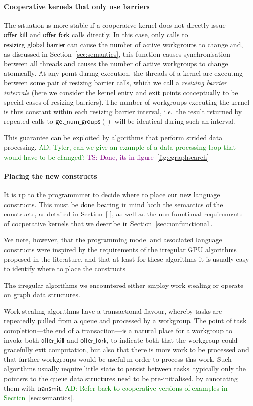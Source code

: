 \documentclass[nocopyrightspace,10pt]{sigplanconf}
\newcommand{\ADComment}[1]{\textcolor{green}{AD: #1}}
\newcommand{\TSComment}[1]{\textcolor{purple}{TS: #1}}
\newcommand{\transmit}{\mathsf{transmit}}
\newcommand{\offerfork}{\mathsf{offer\_fork}}
\newcommand{\offerkill}{\mathsf{offer\_kill}}
\newcommand{\resizingglobalbarrier}{\mathsf{resizing\_global\_barrier}}
\newcommand{\getnumgroups}{\mathsf{get\_num\_groups}}
\begin{document}
\paragraph{Cooperative kernels that only use barriers}

The situation is more stable if a cooperative kernel does not directly
issue $\offerkill$ and $\offerfork$ calls directly.  In this case,
only calls to $\resizingglobalbarrier$ can cause the number of active
workgroups to change and, as discussed in Section~\ref{sec:semantics},
this function causes synchronisation between all threads and causes
the number of active workgroups to change atomically.  At any point
during execution, the threads of a kernel are executing between some
pair of resizing barrier calls, which we call a \emph{resizing barrier
  intervals} (here we consider the kernel entry and exit points
conceptually to be special cases of resizing barriers).  The number of
workgroups executing the kernel is thus constant within each resizing
barrier interval, i.e.\ the result returned by repeated calls to
$\getnumgroups()$ will be identical during such an interval.

This guarantee can be exploited by algorithms that perform strided
data processing.  \ADComment{Tyler, can we give an example of a data
  processing loop that would have to be changed?} \TSComment{Done,
its in figure~\ref{fig:cgraphsearch}}

\paragraph{Placing the new constructs}

It is up to the programmmer to decide where to place our new language
constructs.  This must be done bearing in mind both the semantics of
the constructs, as detailed in Section~\ref{ }, as well as the
non-functional requirements of cooperative kernels that we describe in
Section~\ref{sec:nonfunctional}.

We note, however, that the programming model and associated language
constructs were inspired by the requirements of the irregular GPU
algorithms proposed in the literature, and that at least for these
algorithms it is usually easy to identify where to place the
constructs.

The irregular algorithms we encountered either employ work stealing or
operate on graph data structures.

Work stealing algorithms have a transactional flavour, whereby tasks
are repeatedly pulled from a queue and processed by a workgroup.  The
point of task completion---the end of a transaction---is a natural
place for a workgroup to invoke both $\offerkill$ and $\offerfork$, to
indicate both that the workgroup could gracefully exit computation,
but also that there is more work to be processed and that further
workgroups would be useful in order to process this work.  Such
algorithms usually require little state to persist between tasks;
typically only the pointers to the queue data structures need to be
pre-initialised, by annotating them with $\transmit$.
\ADComment{Refer back to cooperative versions of examples in
  Section~\ref{sec:semantics}.}
\end{document}
